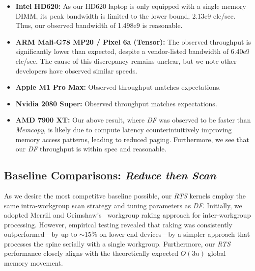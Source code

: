 \documentclass[sigconf]{acmart}
\begin{document}
\begin{itemize}
  \item \textbf{Intel HD620:} As our HD620 laptop is only equipped with a single memory DIMM, its peak bandwidth is limited to the lower bound, 2.13e9 ele/sec. Thus, our observed bandwidth of 1.498e9 is reasonable.
  \item \textbf{ARM Mali-G78 MP20 / Pixel 6a (Tensor):} The observed throughput is significantly lower than expected, despite a vendor-listed bandwidth of 6.40e9 ele/sec. The cause of this discrepancy remains unclear, but we note other developers have observed similar speeds.
  \item \textbf{Apple M1 Pro Max:} Observed throughput matches expectations.
  \item \textbf{Nvidia 2080 Super:} Observed throughput matches expectations.
  \item \textbf{AMD 7900 XT:} Our above result, where \emph{DF} was observed to be faster than \emph{Memcopy}, is likely due to compute latency counterintuitively improving memory access patterns, leading to reduced paging. Furthermore, we see that our \emph{DF} throughput is within spec and reasonable.
\end{itemize}

\subsection{Baseline Comparisons: \emph{Reduce then Scan}}%
\label{sec:rts}
As we desire the most competitve baseline possible, our \emph{RTS} kernels employ the same intra-workgroup scan strategy and tuning parameters as \emph{DF}. Initially, we adopted Merrill and Grimshaw's~\cite{Merrill2009} workgroup raking approach for inter-workgroup processing. However, empirical testing revealed that raking was consistently outperformed—by up to $\sim$15\% on lower-end devices—by a simpler approach that processes the spine serially with a single workgroup. Furthermore, our \emph{RTS} performance closely aligns with the theoretically expected $O(3n)$ global memory movement.



\end{document}
